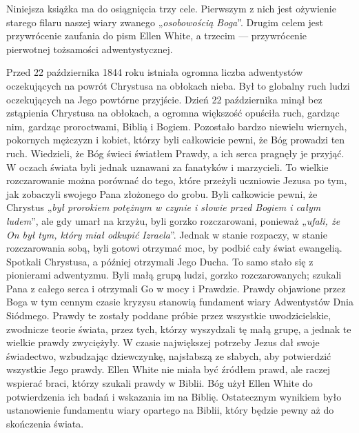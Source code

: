 
Niniejsza książka ma do osiągnięcia trzy cele. Pierwszym z nich jest ożywienie starego filaru naszej wiary zwanego „\textit{osobowością Boga}”. Drugim celem jest przywrócenie zaufania do pism Ellen White, a trzecim — przywrócenie pierwotnej tożsamości adwentystycznej.

Przed 22 października 1844 roku istniała ogromna liczba adwentystów oczekujących na powrót Chrystusa na obłokach nieba. Był to globalny ruch ludzi oczekujących na Jego powtórne przyjście. Dzień 22 października minął bez zstąpienia Chrystusa na obłokach, a ogromna większość opuściła ruch, gardząc nim, gardząc proroctwami, Biblią i Bogiem. Pozostało bardzo niewielu wiernych, pokornych mężczyzn i kobiet, którzy byli całkowicie pewni, że Bóg prowadzi ten ruch. Wiedzieli, że Bóg świeci światłem Prawdy, a ich serca pragnęły je przyjąć. W oczach świata byli jednak uznawani za fanatyków i marzycieli. To wielkie rozczarowanie można porównać do tego, które przeżyli uczniowie Jezusa po tym, jak zobaczyli swojego Pana złożonego do grobu. Byli całkowicie pewni, że Chrystus „\textit{był prorokiem potężnym w czynie i słowie przed Bogiem i całym ludem}”, ale gdy umarł na krzyżu, byli gorzko rozczarowani, ponieważ „\textit{ufali, że On był tym, który miał odkupić Izraela}”. Jednak w stanie rozpaczy, w stanie rozczarowania sobą, byli gotowi otrzymać moc, by podbić cały świat ewangelią. Spotkali Chrystusa, a później otrzymali Jego Ducha. To samo stało się z pionierami adwentyzmu. Byli małą grupą ludzi, gorzko rozczarowanych; szukali Pana z całego serca i otrzymali Go w mocy i Prawdzie. Prawdy objawione przez Boga w tym cennym czasie kryzysu stanowią fundament wiary Adwentystów Dnia Siódmego. Prawdy te zostały poddane próbie przez wszystkie uwodzicielskie, zwodnicze teorie świata, przez tych, którzy wyszydzali tę małą grupę, a jednak te wielkie prawdy zwyciężyły. W czasie największej potrzeby Jezus dał swoje świadectwo, wzbudzając dziewczynkę, najsłabszą ze słabych, aby potwierdzić wszystkie Jego prawdy. Ellen White nie miała być źródłem prawd, ale raczej wspierać braci, którzy szukali prawdy w Biblii. Bóg użył Ellen White do potwierdzenia ich badań i wskazania im na Biblię. Ostatecznym wynikiem było ustanowienie fundamentu wiary opartego na Biblii, który będzie pewny aż do skończenia świata.


